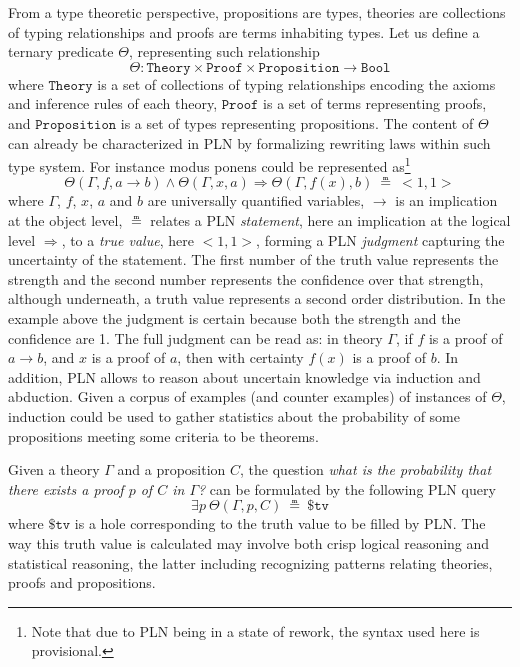 \documentclass{easychair}
\newcommand{\U}{\Theta}
\newcommand{\Theory}{\texttt{Theory}}
\newcommand{\Proof}{\texttt{Proof}}
\newcommand{\Proposition}{\texttt{Proposition}}
\newcommand{\Bool}{\texttt{Bool}}
\newcommand{\arrow}{\to}
\newcommand{\limp}{\Rightarrow}
\newcommand{\True}{\texttt{True}}
\newcommand{\STV}[2]{<\!#1, #2\!>}
\begin{document}
From a type theoretic perspective, propositions are types, theories
are collections of typing relationships and proofs are terms
inhabiting types.  Let us define a ternary predicate $\U$,
representing such relationship
$$\U : \Theory \times \Proof \times \Proposition \arrow \Bool$$ where
$\Theory$ is a set of collections of typing relationships encoding the
axioms and inference rules of each theory, $\Proof$ is a set of terms
representing proofs, and $\Proposition$ is a set of types representing
propositions.  The content of $\U$ can already be characterized in PLN
by formalizing rewriting laws within such type system.  For instance
modus ponens could be represented as\footnote{Note that due to PLN
being in a state of rework, the syntax used here is provisional.}
$$\U(\Gamma, f, a \to b) \land \U(\Gamma, x, a) \limp \U(\Gamma, f(x),
b)\ \measeq\ \STV{1}{1}$$ where $\Gamma$, $f$, $x$, $a$ and $b$ are
universally quantified variables, $\to$ is an implication at the
object level, $\measeq$ relates a PLN \emph{statement}, here an
implication at the logical level $\limp$, to a \emph{true value}, here
$\STV{1}{1}$, forming a PLN \emph{judgment} capturing the uncertainty
of the statement.  The first number of the truth value represents the
strength and the second number represents the confidence over that
strength, although underneath, a truth value represents a second order
distribution.  In the example above the judgment is certain because
both the strength and the confidence are 1.  The full judgment can be
read as: in theory $\Gamma$, if $f$ is a proof of $a \arrow b$, and
$x$ is a proof of $a$, then with certainty $f(x)$ is a proof of $b$.
In addition, PLN allows to reason about uncertain knowledge via
induction and abduction.  Given a corpus of examples (and counter
examples) of instances of $\Theta$, induction could be used to gather
statistics about the probability of some propositions meeting some
criteria to be theorems.

Given a theory $\Gamma$ and a proposition $C$, the question \emph{what
is the probability that there exists a proof $p$ of $C$ in $\Gamma$?}
can be formulated by the following PLN query
$$\exists p\ \U(\Gamma, p, C)\ \measeq\ \$\texttt{tv}$$ where
$\$\texttt{tv}$ is a hole corresponding to the truth value to be
filled by PLN.  The way this truth value is calculated may involve
both crisp logical reasoning and statistical reasoning, the latter
including recognizing patterns relating theories, proofs and
propositions.
\end{document}
